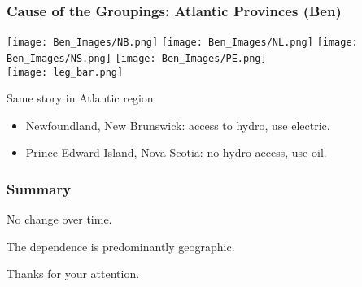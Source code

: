 \documentclass{beamer}
\begin{document}
\begin{frame}
\frametitle{Cause of the Groupings: Atlantic Provinces (Ben)}

\begin{center}
\texttt{[image: Ben\_Images/NB.png]}%
\texttt{[image: Ben\_Images/NL.png]}%
\texttt{[image: Ben\_Images/NS.png]}%
\texttt{[image: Ben\_Images/PE.png]}\\[10pt]
\texttt{[image: leg\_bar.png]}
\end{center}

Same story in Atlantic region:
	\begin{itemize}
		\item Newfoundland, New Brunswick: access to hydro, use electric.
		\item Prince Edward Island, Nova Scotia: no hydro access, use oil.
	\end{itemize}

\end{frame}


















\begin{frame}
\frametitle{Summary}

No change over time.

The dependence is predominantly geographic.

Thanks for your attention.

\end{frame}
\end{document}
